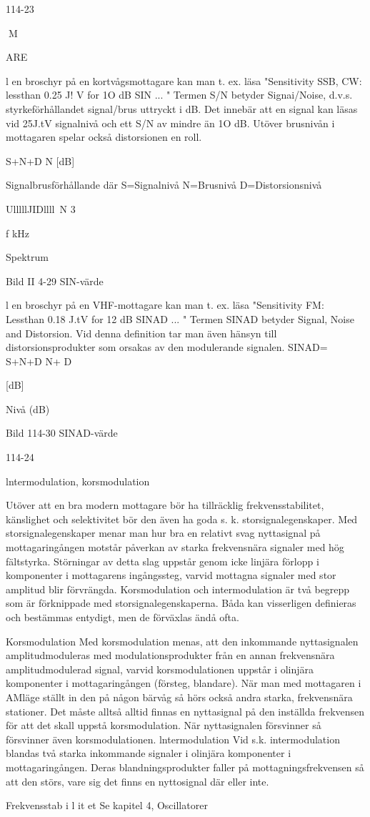 114-23

M

ARE

l en broschyr på en kortvågsmottagare
kan man t. ex. läsa "Sensitivity SSB, CW:
lessthan 0.25 J! V for 1O dB SIN ... "
Termen S/N betyder Signai/Noise, d.v.s.
styrkeförhållandet signal/brus uttryckt i dB.
Det innebär att en signal kan läsas vid 25J.tV
signalnivå och ett S/N av mindre än 1O dB.
Utöver brusnivån i mottagaren spelar också
distorsionen en roll.

S+N+D
N
[dB]

Signalbrusförhållande
där S=Signalnivå
N=Brusnivå
D=Distorsionsnivå

UlllllJIDllll~N
3

f kHz

Spektrum

Bild II 4-29 SIN-värde

l en broschyr på en VHF-mottagare kan
man t. ex. läsa "Sensitivity FM: Lessthan
0.18 J.tV for 12 dB SINAD ... "
Termen SINAD betyder Signal, Noise
and Distorsion. Vid denna definition tar man
även hänsyn till distorsionsprodukter som
orsakas av den modulerande signalen.
SINAD= S+N+D
N+ D

[dB]

Nivå
(dB)

Bild 114-30 SINAD-värde

114-24

lntermodulation, korsmodulation

Utöver att en bra modern mottagare bör ha
tillräcklig frekvensstabilitet, känslighet och
selektivitet bör den även ha goda s. k. storsignalegenskaper.
Med storsignalegenskaper menar man
hur bra en relativt svag nyttasignal på mottagaringången motstår påverkan av starka
frekvensnära signaler med hög fältstyrka.
Störningar av detta slag uppstår genom icke
linjära förlopp i komponenter i mottagarens
ingångssteg, varvid mottagna signaler med
stor amplitud blir förvrängda.
Korsmodulation och intermodulation är
två begrepp som är förknippade med storsignalegenskaperna. Båda kan visserligen
definieras och bestämmas entydigt, men de
förväxlas ändå ofta.

Korsmodulation
Med korsmodulation menas, att den inkommande nyttasignalen amplitudmoduleras
med modulationsprodukter från en annan
frekvensnära amplitudmodulerad signal,
varvid korsmodulationen uppstår i olinjära
komponenter i mottagaringången (försteg,
blandare). När man med mottagaren i AMläge ställt in den på någon bärvåg så hörs
också andra starka, frekvensnära stationer.
Det måste alltså alltid finnas en nyttasignal på den inställda frekvensen för att det
skall uppstå korsmodulation. När nyttasignalen försvinner så försvinner även korsmodulationen.
lntermodulation
Vid s.k. intermodulation blandas två starka
inkommande signaler i olinjära komponenter
i mottagaringången. Deras blandningsprodukter faller på mottagningsfrekvensen
så att den störs, vare sig det finns en nyttosignal där eller inte.

Frekvensstab i l it et
Se kapitel 4, Oscillatorer


